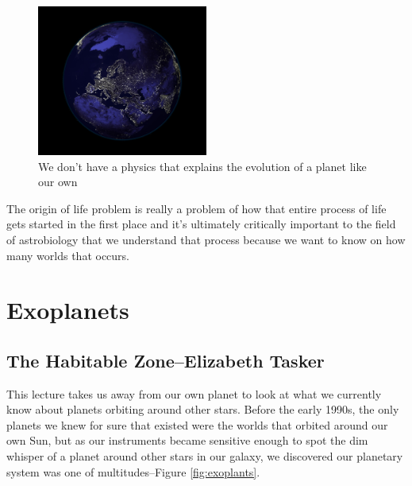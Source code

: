 \documentclass[]{article}
\begin{document}
\begin{figure}[H]
	\begin{center}
		\caption[We don't have a physics that explains the evolution of our planet]{We don't have a physics that explains the evolution of a planet like our own}\label{fig:tellus}
		\includegraphics[width=0.5\textwidth]{Tellus}
	\end{center}
\end{figure}

The origin of life problem is really a problem of how that entire process of life gets started in the first place and it's ultimately critically important to the field of astrobiology that we understand that process because we want to know on how many worlds that occurs.


\section{Exoplanets}

\subsection[The Habitable Zone]{The Habitable Zone--Elizabeth Tasker}

This lecture takes us away from our own planet to look at what we currently know about
planets orbiting around other stars.
Before the early 1990s, the only planets we knew for sure that existed were the worlds that orbited around our own Sun, but as our instruments became sensitive enough to spot
the dim whisper of a planet around other stars in our galaxy, we discovered our planetary system was one of multitudes--Figure \ref{fig:exoplants}.
\end{document}
